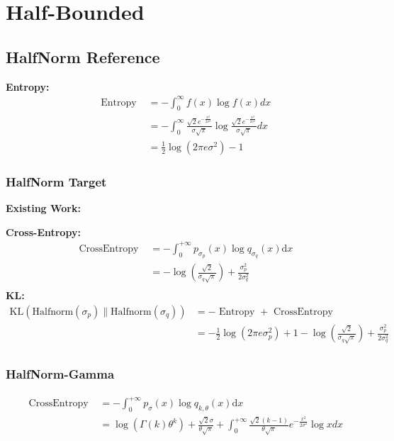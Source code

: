 \documentclass{article}
\begin{document}
\section{Half-Bounded}
\subsection{HalfNorm Reference}

\noindent \textbf{Entropy:}
$$ \begin{aligned} \text { Entropy }&=-\int_{0}^{\infty} f(x) \log f(x) d x\\&=-\int_{0}^{\infty}\frac{\sqrt{2}e^{-\frac{x^{2} }{2\sigma^{2}}}}{\sigma\sqrt{\pi}}\log\frac{\sqrt{2}e^{-\frac{x^{2} }{2\sigma^{2}}}}{\sigma\sqrt{\pi}} d x\\&=\frac{1}{2} \log\left(2 \pi e \sigma^{2}\right)-1
\end{aligned} $$

\subsubsection{HalfNorm Target}

\noindent \textbf{Existing Work:}

\noindent \textbf{Cross-Entropy:}
$$ \begin{aligned} \text { CrossEntropy }&=-\int_{0}^{+\infty} p_{\sigma_{p}}(x) \log q_{\sigma_{q}}(x) \mathrm{d} x \\&=
-\log(\frac{\sqrt{2}}{\sigma_{q}\sqrt{\pi}} )+\frac{\sigma_{p}^{2}}{2\sigma_{q}^{2}} \\
\end{aligned} $$
\noindent \textbf{KL:}
$$ \begin{aligned}\mathrm{KL}\left(\mathrm{Halfnorm}\left(\sigma_{p}\right) \| \mathrm{Halfnorm}\left(\sigma_{q}\right)\right)&=-\text { Entropy }+\text{ CrossEntropy }\\&=
- \frac{1}{2} \log\left(2 \pi e \sigma_{p}^{2}\right)+1 -\log(\frac{\sqrt{2}}{\sigma_{q}\sqrt{\pi}} )+\frac{\sigma_{p}^{2}}{2\sigma_{q}^{2}} \\
\end{aligned} $$

\subsubsection{HalfNorm-Gamma}
$$ \begin{aligned} \text { CrossEntropy }&=-\int_{0}^{+\infty} p_{\sigma}(x) \log q_{k, \theta}(x) \mathrm{d} x \\
&=\log(\Gamma (k)\theta^{k} )+\frac{\sqrt{2}\sigma}{\theta\sqrt\pi} +\int_{0}^{+\infty} \frac{\sqrt{2}(k-1)}{\theta\sqrt\pi}e^{-\frac{x^{2}}{2\sigma^{2}} }\log x dx\\
\end{aligned} $$
\end{document}
